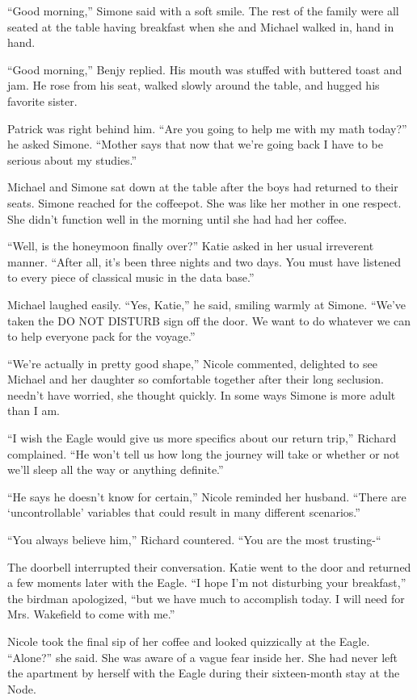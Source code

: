 \documentclass[]{article}
\begin{document}
{“Good morning,” Simone said with a soft smile.  The rest of the family were all seated at the table having breakfast when she and Michael walked in, hand in hand.

“Good morning,” Benjy replied.  His mouth was stuffed with buttered toast and jam.  He rose from his seat, walked slowly around the table, and hugged his favorite sister.

Patrick was right behind him.  “Are you going to help me with my math today?” he asked Simone.  “Mother says that now that we’re going back I have to be serious about my studies.”

Michael and Simone sat down at the table after the boys had returned to their seats.  Simone reached for the coffeepot.  She was like her mother in one respect.  She didn’t function well in the morning until she had had her coffee.

“Well, is the honeymoon finally over?” Katie asked in her usual irreverent manner.  “After all, it’s been three nights and two days.  You must have listened to every piece of classical music in the data base.”

Michael laughed easily.  “Yes, Katie,” he said, smiling warmly at Simone.  “We’ve taken the DO NOT DISTURB sign off the door.  We want to do whatever we can to help everyone pack for the voyage.”

“We’re actually in pretty good shape,” Nicole commented, delighted to see Michael and her daughter so comfortable together after their long seclusion.  needn’t have worried, she thought quickly.  In some ways Simone is more adult than I am.

“I wish the Eagle would give us more specifics about our return trip,” Richard complained.  “He won’t tell us how long the journey will take or whether or not we’ll sleep all the way or anything definite.”

“He says he doesn’t know for certain,” Nicole reminded her husband.  “There are ‘uncontrollable’ variables that could result in many different scenarios.”

“You always believe him,” Richard countered.  “You are the most trusting-“

The doorbell interrupted their conversation.  Katie went to the door and returned a few moments later with the Eagle.  “I hope I’m not disturbing your breakfast,” the birdman apologized, “but we have much to accomplish today.  I will need for Mrs.  Wakefield to come with me.”

Nicole took the final sip of her coffee and looked quizzically at the Eagle.  “Alone?” she said.  She was aware of a vague fear inside her.  She had never left the apartment by herself with the Eagle during their sixteen-month stay at the Node.

}
\end{document}
